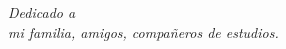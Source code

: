 
\thispagestyle{empty}
\begin{flushright}
	\textit{Dedicado a \\
		mi familia, amigos, compañeros de estudios.}
\end{flushright}
\afterpage{\null\newpage}
\pagestyle{empty}
